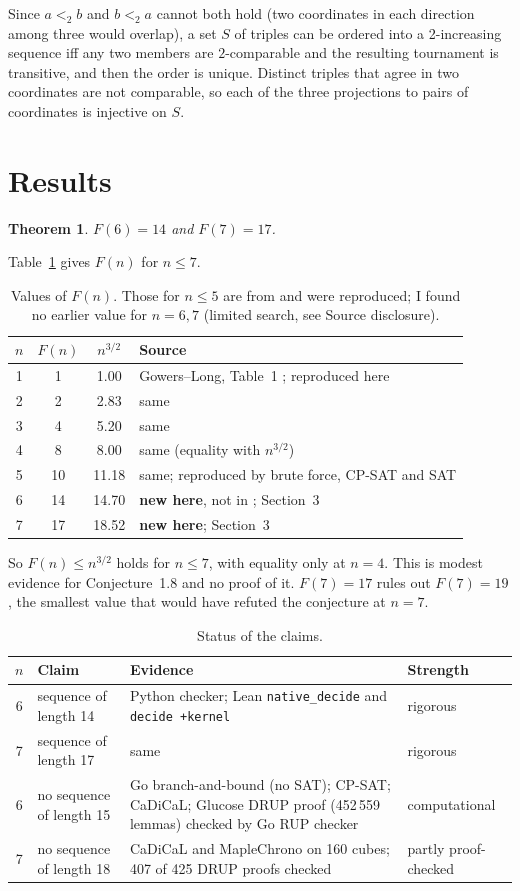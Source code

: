 \documentclass[11pt]{article}
\newtheorem{theorem}{Theorem}
\begin{document}
Since $a<_2 b$ and $b<_2 a$ cannot both hold (two coordinates in each direction among three would overlap), a set $S$ of triples can be ordered into a 2-increasing sequence iff any two members are $2$-comparable and the resulting tournament is transitive, and then the order is unique. Distinct triples that agree in two coordinates are not comparable, so each of the three projections to pairs of coordinates is injective on $S$.

\section{Results}
\begin{theorem}
$F(6)=14$ and $F(7)=17$.
\end{theorem}
Table~\ref{tab:F} gives $F(n)$ for $n\le7$.
\begin{table}[h]
\centering\small
\begin{tabular}{@{}cccp{7.2cm}@{}}
\toprule
$n$ & $F(n)$ & $n^{3/2}$ & Source\\
\midrule
1 & 1 & 1.00 & Gowers--Long, Table~1 \cite{gl}; reproduced here\\
2 & 2 & 2.83 & same\\
3 & 4 & 5.20 & same\\
4 & 8 & 8.00 & same (equality with $n^{3/2}$)\\
5 & 10 & 11.18 & same; reproduced by brute force, CP-SAT and SAT\\
6 & 14 & 14.70 & \textbf{new here}, not in \cite{gl}; Section~3\\
7 & 17 & 18.52 & \textbf{new here}; Section~3\\
\bottomrule
\end{tabular}
\caption{Values of $F(n)$. Those for $n\le5$ are from \cite{gl} and were reproduced; I found no earlier value for $n=6,7$ (limited search, see Source disclosure).}\label{tab:F}
\end{table}
So $F(n)\le n^{3/2}$ holds for $n\le7$, with equality only at $n=4$. This is modest evidence for Conjecture~1.8 and no proof of it. $F(7)=17$ rules out $F(7)=19$, the smallest value that would have refuted the conjecture at $n=7$.

\begin{table}[h]
\centering\small
\begin{tabular}{@{}cp{2.7cm}p{6.6cm}p{2.3cm}@{}}
\toprule
$n$ & Claim & Evidence & Strength\\
\midrule
6 & sequence of length 14 & Python checker; Lean \texttt{native\_decide} and \texttt{decide +kernel} & rigorous\\
7 & sequence of length 17 & same & rigorous\\
6 & no sequence of length 15 & Go branch-and-bound (no SAT); CP-SAT; CaDiCaL; Glucose DRUP proof (452\,559 lemmas) checked by Go RUP checker & computational\\
7 & no sequence of length 18 & CaDiCaL and MapleChrono on 160 cubes; 407 of 425 DRUP proofs checked & partly proof-checked\\
\bottomrule
\end{tabular}
\caption{Status of the claims.}\label{tab:st}
\end{table}
\end{document}
